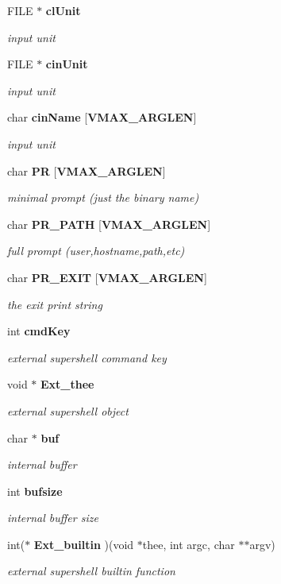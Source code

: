 \begin{DoxyCompactItemize}
F\+I\+L\+E $\ast$ {\bf cl\+Unit}
\begin{DoxyCompactList}\small\item\em input unit \end{DoxyCompactList}\item 
F\+I\+L\+E $\ast$ {\bf cin\+Unit}
\begin{DoxyCompactList}\small\item\em input unit \end{DoxyCompactList}\item 
char {\bf cin\+Name} [{\bf V\+M\+A\+X\+\_\+\+A\+R\+G\+L\+E\+N}]
\begin{DoxyCompactList}\small\item\em input unit \end{DoxyCompactList}\item 
char {\bf P\+R} [{\bf V\+M\+A\+X\+\_\+\+A\+R\+G\+L\+E\+N}]
\begin{DoxyCompactList}\small\item\em minimal prompt (just the binary name) \end{DoxyCompactList}\item 
char {\bf P\+R\+\_\+\+P\+A\+T\+H} [{\bf V\+M\+A\+X\+\_\+\+A\+R\+G\+L\+E\+N}]
\begin{DoxyCompactList}\small\item\em full prompt (user,hostname,path,etc) \end{DoxyCompactList}\item 
char {\bf P\+R\+\_\+\+E\+X\+I\+T} [{\bf V\+M\+A\+X\+\_\+\+A\+R\+G\+L\+E\+N}]
\begin{DoxyCompactList}\small\item\em the exit print string \end{DoxyCompactList}\item 
int {\bf cmd\+Key}
\begin{DoxyCompactList}\small\item\em external supershell command key \end{DoxyCompactList}\item 
void $\ast$ {\bf Ext\+\_\+thee}
\begin{DoxyCompactList}\small\item\em external supershell object \end{DoxyCompactList}\item 
char $\ast$ {\bf buf}
\begin{DoxyCompactList}\small\item\em internal buffer \end{DoxyCompactList}\item 
int {\bf bufsize}
\begin{DoxyCompactList}\small\item\em internal buffer size \end{DoxyCompactList}\item 
int($\ast$ {\bf Ext\+\_\+builtin} )(void $\ast$thee, int argc, char $\ast$$\ast$argv)
\begin{DoxyCompactList}\small\item\em external supershell builtin function \end{DoxyCompactList}\end{DoxyCompactItemize}



